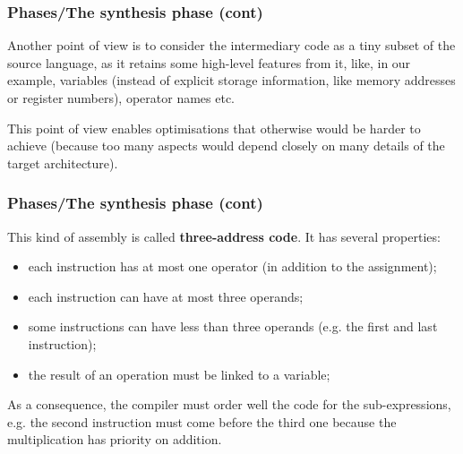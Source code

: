 % 
\begin{frame}
\frametitle{Phases/The synthesis phase (cont)}

Another point of view is to consider the intermediary code as a tiny
subset of the source language, as it retains some high-level features
from it, like, in our example, variables (instead of explicit storage
information, like memory addresses or register numbers), operator
names etc.

\bigskip

This point of view enables optimisations that otherwise would be
harder to achieve (because too many aspects would depend closely on
many details of the target architecture).

\end{frame}

% 
\begin{frame}
\frametitle{Phases/The synthesis phase (cont)}

This kind of assembly is called \textbf{three-address code}. It has
several properties:
\begin{itemize}

  \item each instruction has at most one operator (in addition to the
  assignment);

  \item each instruction can have at most three operands;

  \item some instructions can have less than three operands (e.g. the
  first and last instruction);

  \item the result of an operation must be linked to a variable; 

\end{itemize}
As a consequence, the compiler must order well the code for the
sub-expressions, e.g. the second instruction must come before the
third one because the multiplication has priority on addition.

\end{frame}

